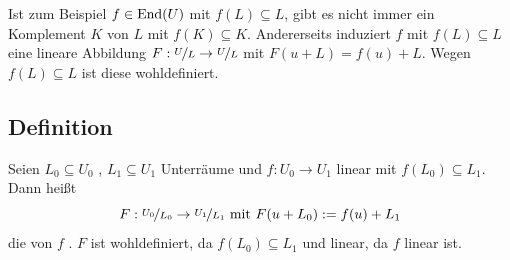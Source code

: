 Ist zum Beispiel $f \in \operatorname{End}(U)$ mit $f(L) \subseteq L$, gibt es nicht immer ein Komplement $K$ von $L$ mit $f(K) \subseteq K$. Andererseits induziert $f$ mit 
$f(L) \subseteq L$ eine lineare Abbildung $ F : \nicefrac{U}{L} \to \nicefrac{U}{L}$ mit $F(u + L)= f(u) + L$. Wegen $f(L) \subseteq L$ ist diese wohldefiniert. 

\subsection[Definition: induzierte Abbildung]{Definition} %
\label{sub:37}
Seien $L_0 \subseteq U_0$ , $L_1 \subseteq U_1$ Unterräume und $f : U_0 \to U_1$ linear mit $f(L_0) \subseteq L_1 $. Dann heißt 
\[
	F : \nicefrac{U_0}{L_0} \to \nicefrac{U_1}{L_1} \text{ mit } F(u+L_0) := f(u) + L_1
\]
die von $f$ . $F$ ist wohldefiniert, da $f(L_0) \subseteq L_1$ und linear, da $f$ linear ist. 

